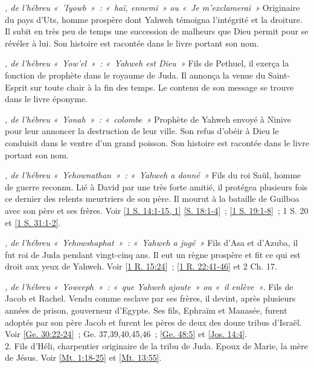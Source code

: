 \begin{multicols}{2}
\textit{, de l'hébreu «~'Iyowb~»~: «~haï, ennemi~» ou «~Je m'exclamerai~»}\newline
Originaire du pays d'Uts, homme prospère dont Yahweh témoigna l'intégrité et la droiture. Il subit en très peu de temps une succession de malheurs que Dieu permit pour se révéler à lui. Son histoire est racontée dans le livre portant son nom.

\textit{, de l'hébreu «~Yow'el~»~: «~Yahweh est Dieu~»}\newline
Fils de Pethuel, il exerça la fonction de prophète dans le royaume de Juda. Il annonça la venue du Saint-Esprit sur toute chair à la fin des temps. Le contenu de son message se trouve dans le livre éponyme.

\textit{, de l'hébreu «~Yonah~»~: «~colombe~»}\newline
Prophète de Yahweh envoyé à Ninive pour leur annoncer la destruction de leur ville. Son refus d'obéir à Dieu le conduisit dans le ventre d'un grand poisson. Son histoire est racontée dans le livre portant son nom.

\textit{, de l'hébreu «~Yehownathan~»~: «~Yahweh a donné~»}\newline
Fils du roi Saül, homme de guerre reconnu. Lié à David par une très forte amitié, il protégea plusieurs fois ce dernier des relents meurtriers de son père. Il mourut à la bataille de Guilboa avec son père et ses frères. Voir \vref{1 S. 14:1-15, 1} \vref{S. 18:1-4}~; \vref{1 S. 19:1-8}~; 1 S. 20 et \vref{1 S. 31:1-2}.

\textit{, de l'hébreu «~Yehowshaphat~»~: «~Yahweh a jugé~»}\newline
Fils d'Asa et d'Azuba, il fut roi de Juda pendant vingt-cinq ans. Il eut un règne prospère et fit ce qui est droit aux yeux de Yahweh. Voir \vref{1 R. 15:24}~; \vref{1 R. 22:41-46} et 2 Ch. 17.

\textit{, de l'hébreu «~Yowceph~»~: «~que Yahweh ajoute~» ou «~il enlève~»}. Fils de Jacob et Rachel. Vendu comme esclave par ses frères, il devint, après plusieurs années de prison, gouverneur d'Egypte. Ses fils, Ephraïm et Manasée, furent adoptés par son père Jacob et furent les pères de deux des douze tribus d'Israël. Voir \vref{Ge. 30:22-24}~; Ge. 37,39,40,45,46~; \vref{Ge. 48:5} et \vref{Jos. 14:4}.
\\2. Fils d'Héli, charpentier originaire de la tribu de Juda. Epoux de Marie, la mère de Jésus. Voir \vref{Mt. 1:18-25} et \vref{Mt. 13:55}.


\end{multicols}
